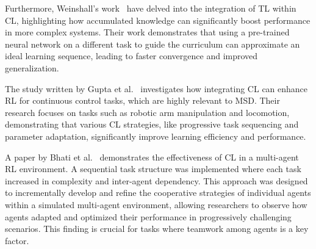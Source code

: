 Furthermore, Weinshall's work~\cite{weinshall2018cltransfer} have delved into the integration of TL within CL, highlighting how accumulated knowledge can significantly boost performance in more complex systems. Their work demonstrates that using a pre-trained neural network on a different task to guide the curriculum can approximate an ideal learning sequence, leading to faster convergence and improved generalization. 

The study written by Gupta et al.~\cite{gupta2021rlcapabilities} investigates how integrating CL can enhance RL for continuous control tasks, which are highly relevant to MSD. Their research focuses on tasks such as robotic arm manipulation and locomotion, demonstrating that various CL strategies, like progressive task sequencing and parameter adaptation, significantly improve learning efficiency and performance. 

A paper by Bhati et al.~\cite{bhati2023clmulti} demonstrates the effectiveness of CL in a multi-agent RL environment. A sequential task structure was implemented where each task increased in complexity and inter-agent dependency. This approach was designed to incrementally develop and refine the cooperative strategies of individual agents within a simulated multi-agent environment, allowing researchers to observe how agents adapted and optimized their performance in progressively challenging scenarios. This finding is crucial for tasks where teamwork among agents is a key factor. 

